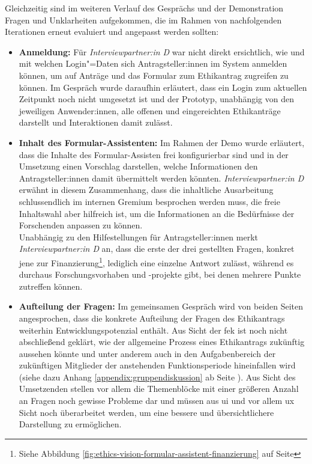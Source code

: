 \documentclass[a4paper,12pt,twoside]{scrreprt}
\begin{document}
Gleichzeitig sind im weiteren Verlauf des Gesprächs und der Demonstration Fragen und Unklarheiten aufgekommen, die im Rahmen von nachfolgenden Iterationen erneut evaluiert und angepasst werden sollten:
\begin{itemize}
    \item \textbf{Anmeldung:} Für \textit{Interviewpartner:in D} war nicht direkt ersichtlich, wie und mit welchen Login"=Daten sich Antragsteller:innen im System anmelden können, um auf Anträge und das Formular zum Ethikantrag zugreifen zu können. Im Gespräch wurde daraufhin erläutert, dass ein Login zum aktuellen Zeitpunkt noch nicht umgesetzt ist und der Prototyp, unabhängig von den jeweiligen Anwender:innen, alle offenen und eingereichten Ethikanträge darstellt und Interaktionen damit zulässt.
    \item \textbf{Inhalt des Formular-Assistenten:} Im Rahmen der Demo wurde erläutert, dass die Inhalte des Formular-Assisten frei konfigurierbar sind und in der Umsetzung einen Vorschlag darstellen, welche Informationen den Antragsteller:innen damit übermittelt werden könnten. \textit{Interviewpartner:in D} erwähnt in diesem Zusammenhang, dass die inhaltliche Ausarbeitung schlussendlich im internen Gremium besprochen werden muss, die freie Inhaltswahl aber hilfreich ist, um die Informationen an die Bedürfnisse der Forschenden anpassen zu können.\\
    Unabhängig zu den Hilfestellungen für Antragsteller:innen merkt \textit{Interviewpartner:in D} an, dass die erste der drei gestellten Fragen, konkret jene zur Finanzierung\footnote{Siehe Abbildung \ref{fig:ethics-vision-formular-assistent-finanzierung} auf Seite \pageref{fig:ethics-vision-formular-assistent-finanzierung}}, lediglich eine einzelne Antwort zulässt, während es durchaus Forschungsvorhaben und -projekte gibt, bei denen mehrere Punkte zutreffen können.
    \item \textbf{Aufteilung der Fragen:} Im gemeinsamen Gespräch wird von beiden Seiten angesprochen, dass die konkrete Aufteilung der Fragen des Ethikantrags weiterhin Entwicklungspotenzial enthält. Aus Sicht der \ac{fek} ist noch nicht abschließend geklärt, wie der allgemeine Prozess eines Ethikantrags zukünftig aussehen könnte und unter anderem auch in den Aufgabenbereich der zukünftigen Mitglieder der anstehenden Funktionsperiode hineinfallen wird (siehe dazu Anhang \ref{appendix:gruppendiskussion} ab Seite \pageref{appendix:gruppendiskussion}). Aus Sicht des Umsetzenden stellen vor allem die Themenblöcke mit einer größeren Anzahl an Fragen noch gewisse Probleme dar und müssen aus \ac{ui} und vor allem \ac{ux} Sicht noch überarbeitet werden, um eine bessere und übersichtlichere Darstellung zu ermöglichen.

\end{itemize}
\end{document}
